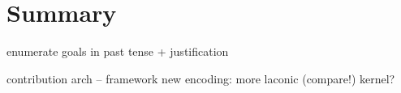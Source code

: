 \chapter{Summary}
\label{ch:summary}

enumerate goals in past tense + justification

contribution
  arch -- framework
  new encoding: more laconic (compare!)
  kernel?
  